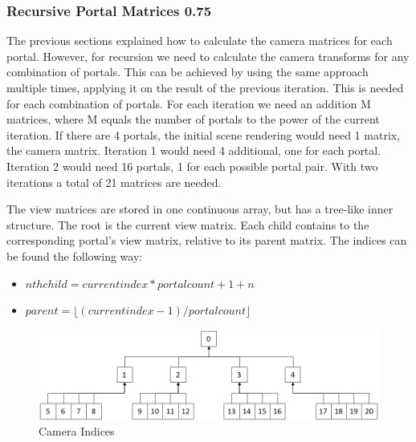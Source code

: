 
\subsubsection{Recursive Portal Matrices 0.75}
\label{section:recursivecameramatrices}
The previous sections explained how to calculate the camera matrices for each portal. However, for recursion we need to calculate the camera transforms for any combination of portals. This can be achieved by using the same approach multiple times, applying it on the result of the previous iteration. This is needed for each combination of portals. For each iteration we need an addition M matrices, where M equals the number of portals to the power of the current iteration. If there are 4 portals, the initial scene rendering would need 1 matrix, the camera matrix. Iteration 1 would need 4 additional, one for each portal. Iteration 2 would need 16 portals, 1 for each possible portal pair. With two iterations a total of 21 matrices are needed.

The view matrices are stored in one continuous array, but has a tree-like inner structure. The root is the current view matrix. Each child contains to the corresponding portal's view matrix, relative to its parent matrix. The indices can be found the following way:

\begin{itemize}
	\item $ nth child = current index * portalcount + 1 + n$
	\item $ parent = \lfloor(current index-1)/portal count\rfloor $
\end{itemize}





\begin{figure}[h]
	\includegraphics[width=\linewidth]{images/cameraindices.png}
	\caption{Camera Indices}
	\label{fig:cameraindices}
\end{figure}


